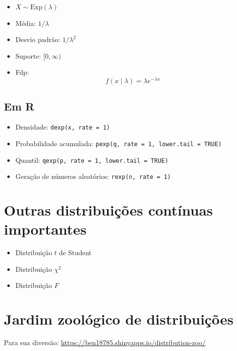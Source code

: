 \documentclass[
  11pt]{report}
\begin{document}
\begin{itemize}
\item
  $X \sim \text{Exp}(\lambda)$
\item
  Média: $1/\lambda$
\item
  Desvio padrão: $1/\lambda^2$
\item
  Suporte: $[0, \infty)$
\item
  Fdp:
  \[
  f(x \mid \lambda) = \lambda e^{-\lambda x}
  \]
\end{itemize}

\hypertarget{em-r-7}{%
\subsection{Em R}\label{em-r-7}}

\begin{itemize}
\item
  Densidade: \texttt{dexp(x,\ rate\ =\ 1)}
\item
  Probabilidade acumulada: \texttt{pexp(q,\ rate\ =\ 1,\ lower.tail\ =\ TRUE)}
\item
  Quantil: \texttt{qexp(p,\ rate\ =\ 1,\ lower.tail\ =\ TRUE)}
\item
  Geração de números aleatórios: \texttt{rexp(n,\ rate\ =\ 1)}
\end{itemize}

\hypertarget{outras-distribuiuxe7uxf5es-contuxednuas-importantes}{%
\section{Outras distribuições contínuas importantes}\label{outras-distribuiuxe7uxf5es-contuxednuas-importantes}}

\begin{itemize}
\item
  Distribuição $t$ de Student
\item
  Distribuição $\chi^2$
\item
  Distribuição $F$
\end{itemize}

\hypertarget{jardim-zooluxf3gico-de-distribuiuxe7uxf5es-1}{%
\section{Jardim zoológico de distribuições}\label{jardim-zooluxf3gico-de-distribuiuxe7uxf5es-1}}

Para sua diversão: \url{https://ben18785.shinyapps.io/distribution-zoo/}
\end{document}
